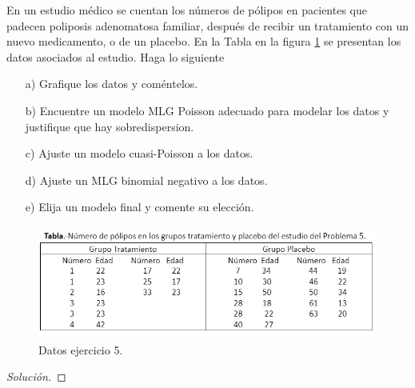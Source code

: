 \documentclass[10.5pt,notitlepage]{article}
\newenvironment{solucion}
  {\begin{proof}[Solución]}
  {\end{proof}}
\theoremstyle{plain}
\begin{document}
\begin{exo}\label{Ej.5}
En un estudio médico se cuentan los números de pólipos en pacientes que padecen poliposis adenomatosa familiar, después de recibir un tratamiento con un nuevo medicamento, o de un placebo. En la Tabla en la figura \ref{fig:my_label3} se presentan los datos asociados al estudio.
Haga lo siguiente
\begin{itemize}
    \item[a)] Grafique los datos y coméntelos.
    \item[b)] Encuentre un modelo MLG Poisson adecuado para modelar los datos y justifique que hay sobredispersion.
    \item[c)] Ajuste un modelo cuasi-Poisson a los datos.
    \item[d)] Ajuste un MLG binomial negativo a los datos. 
    \item[e)] Elija un modelo final y comente su elección.
\end{itemize}
\end{exo} 
\begin{figure}[htb]
    \centering
    \includegraphics[scale = 0.8]{Im3.png}
    \caption{Datos ejercicio 5.}
    \label{fig:my_label3}
\end{figure}
\begin{solucion}

\end{solucion}


\nocite{dunn_generalized_2018}
\printbibliography
\end{document}
